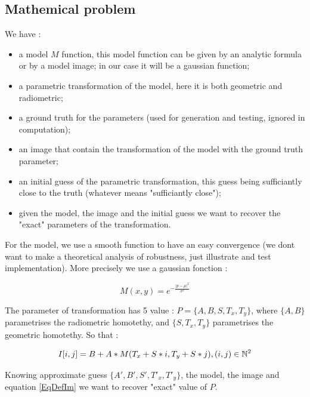 \subsection{Mathemical problem}

We have :

\begin {itemize}
    \item a model $M$  function, this model function can be given by an analytic  formula or by a model image;
          in our case it will be a gaussian function;

    \item a parametric transformation of the model, here it is both geometric and radiometric;

    \item a ground truth for the parameters (used for generation and testing, ignored in computation);

    \item an image that contain the transformation of the model with the ground truth parameter;

    \item an initial guess of the parametric transformation, this guess being sufficiantly close to the
	    truth (whatever means "sufficiantly close");

     \item given the model, the image and the initial guess we want to recover the "exact" parameters of the 
           transformation.

\end {itemize}

For the model, we use  a smooth function to have an easy convergence (we dont want to 
make a theoretical analysis of robustness, just illustrate and test implementation).
More precisely we use a gaussian fonction :

\begin{equation}
	M(x,y) =  e^{-\frac{|p-\mu|^2}{\sigma^2}}
\end{equation}

The  parameter of transformation has 5 value :  $P=\{A,B,S,T_x,T_y\}$, where $\{A,B\}$ parametrises
the radiometric homotethy,  and $\{S,T_x,T_y\}$ parametrises the geometric homotethy.
So that :

\begin{equation}
	I[i,j] =  B + A * M(T_x + S*i,T_y+S*j) , (i,j) \in \mathbb{N}^2  \label{EqDefIm}
\end{equation}

Knowing approximate guess  $\{A',B',S',T'_x,T'_y\}$, the model, the image and equation
\ref{EqDefIm} we want to recover "exact" value of $P$.

